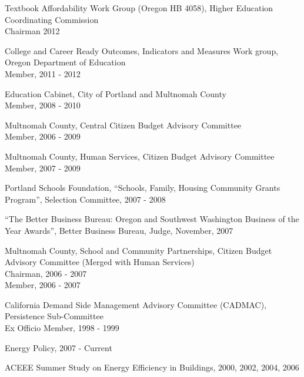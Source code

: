\documentclass[Computer Science]{vita}
\begin{document}
\begin{vita}
\begin{Professional and Service Activities}
\begin{Community}
  \item Textbook Affordability Work Group (Oregon HB 4058), Higher Education Coordinating Commission\\ Chairman 2012

\item College and Career Ready Outcomes, Indicators and Measures Work group, Oregon Department of Education\\
Member, 2011 -  2012

    \item  Education Cabinet, City of Portland and Multnomah County\\
      Member, 2008 - 2010

    \item Multnomah County, Central Citizen Budget Advisory Committee\\
      Member, 2006 - 2009

    \item Multnomah County, Human Services, Citizen Budget Advisory
      Committee\\Member, 2007 - 2009

    \item Portland Schools Foundation, ``Schools, Family, Housing
      Community Grants Program'', Selection Committee, 2007 - 2008

    \item ``The Better Business Bureau: Oregon and Southwest
      Washington Business of the Year Awards'', Better Business
      Bureau, Judge, November, 2007


    \item Multnomah County, School and Community Partnerships, Citizen Budget Advisory Committee (Merged with Human Services)\\
      Chairman, 2006 - 2007\\
      Member, 2006 - 2007
	
    \item California Demand Side Management Advisory Committee (CADMAC), Persistence Sub-Committee\\
      Ex Officio Member, 1998 - 1999

    \end{Community}
    \begin{Journal Article and Paper Review}

    \item Energy Policy, 2007 - Current
    \item ACEEE Summer Study on Energy Efficiency in Buildings, 2000,
      2002, 2004, 2006
  \end{Journal Article and Paper Review}

  \end{Professional and Service Activities}


% 
% 

\end{vita}
\end{document}
